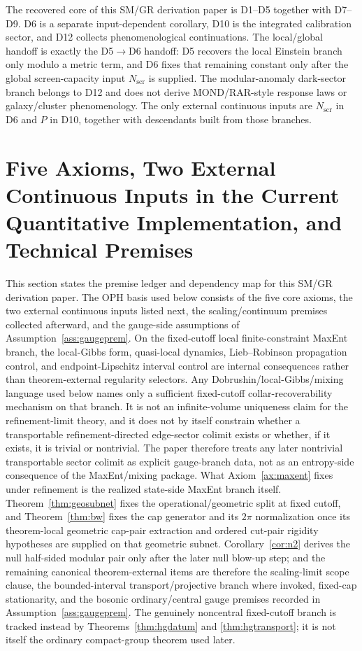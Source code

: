 \documentclass[11pt]{article}
\begin{document}
The recovered core of this SM/GR derivation paper is D1--D5 together with D7--D9. D6 is a separate input-dependent corollary, D10 is the integrated calibration sector, and D12 collects phenomenological continuations. The local/global handoff is exactly the D5\(\to\)D6 handoff: D5 recovers the local Einstein branch only modulo a metric term, and D6 fixes that remaining constant only after the global screen-capacity input \(N_{\mathrm{scr}}\) is supplied. The modular-anomaly dark-sector branch belongs to D12 and does not derive MOND/RAR-style response laws or galaxy/cluster phenomenology. The only external continuous inputs are \(N_{\mathrm{scr}}\) in D6 and \(P\) in D10, together with descendants built from those branches.
\section{Five Axioms, Two External Continuous Inputs in the Current Quantitative Implementation, and Technical Premises}\label{sec:premise-ledger}

This section states the premise ledger and dependency map for this SM/GR derivation paper. The OPH basis used below consists of the five core axioms, the two external continuous inputs listed next, the scaling/continuum premises collected afterward, and the gauge-side assumptions of Assumption~\ref{ass:gaugeprem}. On the fixed-cutoff local finite-constraint MaxEnt branch, the local-Gibbs form, quasi-local dynamics, Lieb--Robinson propagation control, and endpoint-Lipschitz interval control are internal consequences rather than theorem-external regularity selectors. Any Dobrushin/local-Gibbs/mixing language used below names only a sufficient fixed-cutoff collar-recoverability mechanism on that branch. It is not an infinite-volume uniqueness claim for the refinement-limit theory, and it does not by itself constrain whether a transportable refinement-directed edge-sector colimit exists or whether, if it exists, it is trivial or nontrivial. The paper therefore treats any later nontrivial transportable sector colimit as explicit gauge-branch data, not as an entropy-side consequence of the MaxEnt/mixing package. What Axiom~\ref{ax:maxent} fixes under refinement is the realized state-side MaxEnt branch itself. Theorem~\ref{thm:geosubnet} fixes the operational/geometric split at fixed cutoff, and Theorem~\ref{thm:bw} fixes the cap generator and its \(2\pi\) normalization once its theorem-local geometric cap-pair extraction and ordered cut-pair rigidity hypotheses are supplied on that geometric subnet. Corollary~\ref{cor:n2} derives the null half-sided modular pair only after the later null blow-up step; and the remaining canonical theorem-external items are therefore the scaling-limit scope clause, the bounded-interval transport/projective branch where invoked, fixed-cap stationarity, and the bosonic ordinary/central gauge premises recorded in Assumption~\ref{ass:gaugeprem}. The genuinely noncentral fixed-cutoff branch is tracked instead by Theorems~\ref{thm:hgdatum} and \ref{thm:hgtransport}; it is not itself the ordinary compact-group theorem used later.
\end{document}
